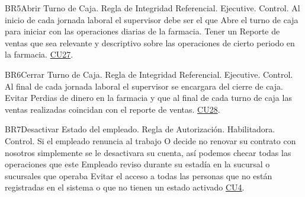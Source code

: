 \begin{BussinesRule}{BR5}{Abrir Turno de Caja.}
	\BRitem[Tipo:] Regla de Integridad Referencial. 
	\BRitem[Clase:] Ejecutive. 
	\BRitem[Nivel:] Control. %
	\BRitem[Descripción:]Al inicio de cada jornada laboral el supervisor debe ser el que Abre el turno de caja para iniciar con las operaciones diarias de la farmacia.
	\BRitem[Motivación:] Tener un Reporte de ventas que sea relevante y descriptivo sobre las operaciones de cierto periodo en la farmacia.
	 \hyperlink{CU27}{CU27}.
\end{BussinesRule}

\begin{BussinesRule}{BR6}{Cerrar Turno de Caja.}
	\BRitem[Tipo:] Regla de Integridad Referencial. 
	\BRitem[Clase:] Ejecutive. 
	\BRitem[Nivel:] Control. %
	\BRitem[Descripción:]Al final de cada jornada laboral el supervisor se encargara del cierre de caja.
	\BRitem[Motivación:] Evitar Perdias de dinero en la farmacia y que al final de cada turno de caja las ventas realizadas coincidan con el reporte de ventas.
	 \hyperlink{CU28}{CU28}.
\end{BussinesRule}
\begin{BussinesRule}{BR7}{Desactivar Estado del empleado.}
	\BRitem[Tipo:] Regla de Autorización. 
	\BRitem[Clase:] Habilitadora. 
	\BRitem[Nivel:] Control. %
	\BRitem[Descripción:] Si el empleado renuncia al trabajo O decide no renovar su contrato con nosotros simplemente se le desactivara su cuenta, así podemos checar todas las operaciones que este Empleado reviso durante su estadía en la sucursal o sucursales que operaba
	\BRitem[Motivación:] Evitar el acceso a todas las personas que no están registradas en el sistema o que no tienen un estado activado 
	 \hyperlink{CU4}{CU4}.
\end{BussinesRule}


